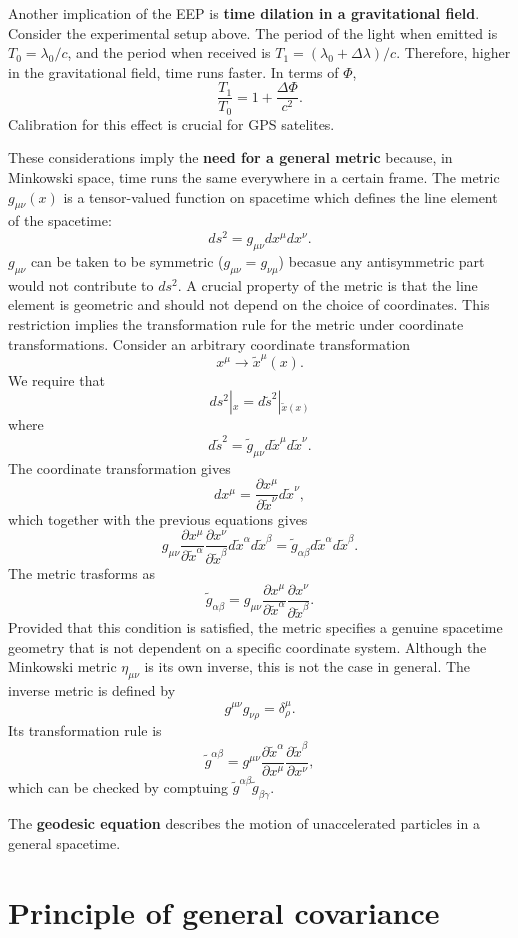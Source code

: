 \documentclass[11pt]{article}
\begin{document}
Another implication of the EEP is \textbf{time dilation in a gravitational field}.
Consider the experimental setup above.
The period of the light when emitted is $T_0 = \lambda_0/c$, and the period when received is $T_1 = (\lambda_0 + \Delta \lambda)/c$.
Therefore, higher in the gravitational field, time runs faster.
In terms of $\Phi$,
$$ \frac{T_1}{T_0} = 1 + \frac{\Delta \Phi}{c^2}. $$
Calibration for this effect is crucial for GPS satelites.

These considerations imply the \textbf{need for a general metric} because, in Minkowski space, time runs the same everywhere in a certain frame.
The metric $g_{\mu \nu}(x)$ is a tensor-valued function on spacetime which defines the line element of the spacetime:
$$ ds^2 = g_{\mu \nu} dx^\mu dx^\nu. $$
$g_{\mu \nu}$ can be taken to be symmetric ($g_{\mu \nu} = g_{\nu \mu}$) becasue any antisymmetric part would not contribute to $ds^2$.
A crucial property of the metric is that the line element is geometric and should not depend on the choice of coordinates.
This restriction implies the transformation rule for the metric under coordinate transformations.
Consider an arbitrary coordinate transformation
$$ x^\mu \rightarrow \tilde{x}^\mu(x). $$
We require that
$$ ds^2|{}_x = d\tilde{s}^2|{}_{\tilde{x}(x)} $$
where
$$ d\tilde{s}^2 = \tilde{g}_{\mu \nu} d\tilde{x}^\mu d\tilde{x}^\nu. $$
The coordinate transformation gives 
$$ dx^\mu = \frac{\partial x^\mu}{\partial \tilde{x}^\nu} d\tilde{x}^\nu, $$
which together with the previous equations gives
$$ g_{\mu \nu} \frac{\partial x^\mu}{\partial \tilde{x}^\alpha} \frac{\partial x^\nu}{\partial \tilde{x}^\beta} d\tilde{x}^\alpha d\tilde{x}^\beta = \tilde{g}_{\alpha \beta} d\tilde{x}^\alpha d\tilde{x}^\beta. $$
The metric trasforms as
$$ \tilde{g}_{\alpha \beta} = g_{\mu \nu} \frac{\partial x^\mu}{\partial \tilde{x}^\alpha} \frac{\partial x^\nu}{\partial \tilde{x}^\beta}. $$
Provided that this condition is satisfied, the metric specifies a genuine spacetime geometry that is not dependent on a specific coordinate system.
Although the Minkowski metric $\eta_{\mu \nu}$ is its own inverse, this is not the case in general.
The inverse metric is defined by
$$ g^{\mu \nu} g_{\nu \rho} = \delta^\mu_\rho. $$
Its transformation rule is
$$ \tilde{g}^{\alpha \beta} = g^{\mu \nu} \frac{\partial \tilde{x}^\alpha}{\partial x^\mu} \frac{\partial \tilde{x}^\beta}{\partial x^\nu}, $$
which can be checked by comptuing $\tilde{g}^{\alpha \beta} \tilde{g}_{\beta \gamma}$.

The \textbf{geodesic equation} describes the motion of unaccelerated particles in a general spacetime.

\section{Principle of general covariance}
\end{document}
